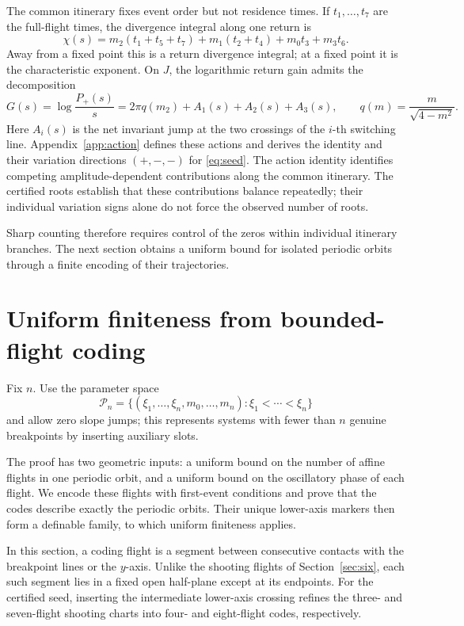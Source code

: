 \documentclass[11pt]{article}
\theoremstyle{remark}
\begin{document}
The common itinerary fixes event order but not residence times.  If
\(t_1,\ldots,t_7\) are the full-flight times, the divergence integral
along one return is
\begin{equation}\label{eq:chi-flight}
 \chi(s)=m_2(t_1+t_5+t_7)+m_1(t_2+t_4)+m_0t_3+m_3t_6.
\end{equation}
Away from a fixed point this is a return divergence integral; at a fixed
point it is the characteristic exponent.  On \(J\), the logarithmic
return gain admits the decomposition
\[
 G(s)=\log\frac{P_+(s)}s
     =2\pi q(m_2)+A_1(s)+A_2(s)+A_3(s),
 \qquad q(m)=\frac m{\sqrt{4-m^2}}.
\]
Here \(A_i(s)\) is the net invariant jump at the two crossings of the
\(i\)-th switching line.  Appendix~\ref{app:action} defines these
actions and derives the identity and their variation directions
\((+,-,-)\) for \eqref{eq:seed}.  The action identity identifies
competing amplitude-dependent contributions along the common itinerary.
The certified roots establish that these contributions balance
repeatedly; their individual variation signs alone do not force the
observed number of roots.

Sharp counting therefore requires control of the zeros within individual
itinerary branches.  The next section obtains a uniform bound for isolated
periodic orbits through a finite encoding of their trajectories.

\section{Uniform finiteness from bounded-flight coding}\label{sec:finite}

Fix \(n\).  Use the parameter space
\[
 \mathcal P_n=\{(\xi_1,\ldots,\xi_n,m_0,\ldots,m_n):
                      \xi_1<\cdots<\xi_n\}
\]
and allow zero slope jumps; this represents systems with fewer than
\(n\) genuine breakpoints by inserting auxiliary slots.

The proof has two geometric inputs: a uniform bound on the number of
affine flights in one periodic orbit, and a uniform bound on the
oscillatory phase of each flight.  We encode these flights with
first-event conditions and prove that the codes describe exactly the
periodic orbits.  Their unique lower-axis markers then form a definable
family, to which uniform finiteness applies.

In this section, a coding flight is a segment between consecutive
contacts with the breakpoint lines or the \(y\)-axis.  Unlike the
shooting flights of Section~\ref{sec:six}, each such segment lies in a
fixed open half-plane except at its endpoints.  For the certified seed,
inserting the intermediate lower-axis crossing refines the three- and
seven-flight shooting charts into four- and eight-flight codes,
respectively.
\end{document}
